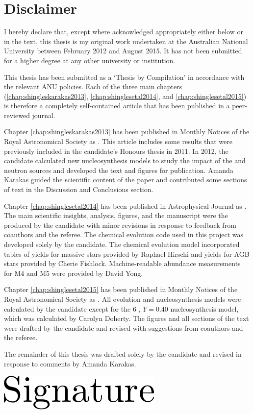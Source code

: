 \section*{Disclaimer}

I hereby declare that, except where acknowledged appropriately either below or in the text, this thesis is my original work undertaken at the Australian National University between February 2012 and August 2015. It has not been submitted for a higher degree at any other university or institution.

This thesis has been submitted as a `Thesis by Compilation' in accordance with the relevant ANU policies. Each of the three main chapters (\ref{chap:shingleskarakas2013}, \ref{chap:shinglesetal2014}, and \ref{chap:shinglesetal2015}) is therefore a completely self-contained article that has been published in a peer-reviewed journal.

Chapter \ref{chap:shingleskarakas2013} has been published in Monthly Notices of the Royal Astronomical Society as \citet*{Shingles:2013kg}. This article includes some results that were previously included in the candidate's Honours thesis in 2011. In 2012, the candidate calculated new nucleosynthesis models to study the impact of the  and  neutron sources and developed the text and figures for publication. Amanda Karakas guided the scientific content of the paper and contributed some sections of text in the Discussion and Conclusions section.

Chapter \ref{chap:shinglesetal2014} has been published in Astrophysical Journal as \citet*{Shingles:2014ja}. The main scientific insights, analysis, figures, and the manuscript were the produced by the candidate with minor revisions in response to feedback from coauthors and the referee. The chemical evolution code used in this project was developed solely by the candidate. The chemical evolution model incorporated tables of yields for massive stars provided by Raphael Hirschi and yields for AGB stars provided by Cherie Fishlock. Machine-readable abundance measurements for M4 and M5 were provided by David Yong.

Chapter \ref{chap:shinglesetal2015} has been published in Monthly Notices of the Royal Astronomical Society as \citet*{Shingles:2015cd}. All evolution and nucleosynthesis models were calculated by the candidate except for the 6 \Msun, $Y=0.40$ nucleosynthesis model, which was calculated by Carolyn Doherty. The figures and all sections of the text were drafted by the candidate and revised with suggestions from coauthors and the referee.

The remainder of this thesis was drafted solely by the candidate and revised in response to comments by Amanda Karakas.

\begin{flushright}
  \includegraphics[width=0.3\linewidth]{signature}\\[2mm]
  \fullname\\
  \fullthesisdate
\end{flushright}
